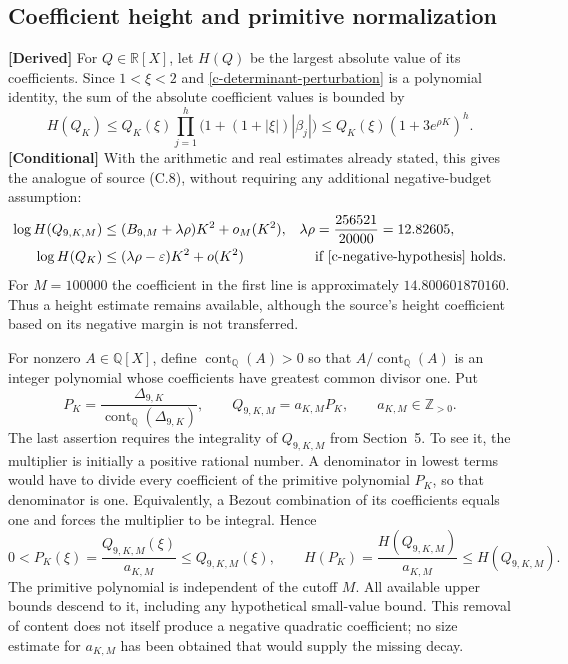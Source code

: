 \subsection{Coefficient height and primitive normalization}
\label{c-height-content}

\noindent\textbf{[Derived]} For $Q\in\mathbb R[X]$, let $H(Q)$ be the
largest absolute value of its coefficients.  Since
$1<\xi<2$ and \eqref{c-determinant-perturbation} is a polynomial
identity, the sum of the absolute coefficient values is bounded by
\[
 H(Q_K)\leq Q_K(\xi)
       \prod_{j=1}^{h}\bigl(1+(1+|\xi|)|\beta_j|\bigr)
 \leq Q_K(\xi)(1+3e^{\rho K})^h.
\]
\noindent\textbf{[Conditional]} With the arithmetic and real estimates
already stated, this gives the analogue of source (C.8), without
requiring any additional negative-budget assumption:
\begin{equation}
 \begin{aligned}
 \log H(Q_{9,K,M})
     &\leq(B_{9,M}+\lambda\rho)K^2+o_M(K^2),
       &\lambda\rho&=\frac{256521}{20000}=12.82605,\\
 \log H(Q_K)&\leq(\lambda\rho-\varepsilon)K^2+o(K^2)
       &&\text{if \eqref{c-negative-hypothesis} holds}.
 \end{aligned}
 \label{c-height-bound}
\end{equation}
For $M=100000$ the coefficient in the first line is approximately
$14.800601870160$.  Thus a height estimate remains available, although
the source's height coefficient based on its negative margin is not
transferred.

For nonzero $A\in\mathbb Q[X]$, define $\operatorname{cont}_{\mathbb Q}(A)>0$
so that $A/\operatorname{cont}_{\mathbb Q}(A)$ is an integer polynomial
whose coefficients have greatest common divisor one.  Put
\begin{equation}
 P_K=\frac{\Delta_{9,K}}{\operatorname{cont}_{\mathbb Q}(\Delta_{9,K})},
 \qquad Q_{9,K,M}=a_{K,M}P_K,\qquad a_{K,M}\in\mathbb Z_{>0}.
 \label{c-primitive-normalization}
\end{equation}
The last assertion requires the integrality of $Q_{9,K,M}$ from
Section~5.  To see it, the multiplier is initially a positive rational
number.  A denominator in lowest terms would have to divide every
coefficient of the primitive polynomial $P_K$, so that denominator is
one.  Equivalently, a Bezout combination of its coefficients equals
one and forces the multiplier to be integral.  Hence
\begin{equation}
 0<P_K(\xi)=\frac{Q_{9,K,M}(\xi)}{a_{K,M}}
       \leq Q_{9,K,M}(\xi),\qquad
 H(P_K)=\frac{H(Q_{9,K,M})}{a_{K,M}}\leq H(Q_{9,K,M}).
 \label{c-primitive-bounds}
\end{equation}
The primitive polynomial is independent of the cutoff $M$.  All
available upper bounds descend to it, including any hypothetical
small-value bound.  This removal of content does not itself produce a
negative quadratic coefficient; no size estimate for $a_{K,M}$ has
been obtained that would supply the missing decay.
